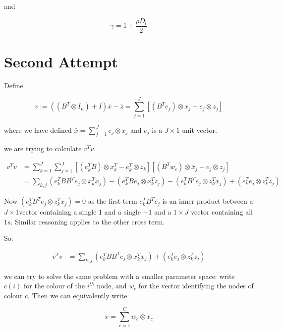 \documentclass{article}
\begin{document}
and 

\begin{equation}
\gamma = 1+ \frac{\rho D_l}{2}
\end{equation}

\section{Second Attempt}

Define

\begin{equation}
v := \left(\left(B^T \otimes I_n\right)+I\right)\bar{x}-\bar{z} = \sum_{j=1}^J \left[\left(B^Te_j\right)\otimes x_j - e_j\otimes z_j\right]
\end{equation}

where we have defined \(\bar{x} = \sum_{j=1}^J e_j \otimes x_j\) and \(e_j\) is a \(J \times 1\) unit vector.

we are trying to calculate \(v^Tv\). 

\begin{align*}
v^Tv &= \sum_{k=1}^J \sum_{j=1}^J \left[\left(e_k^TB\right)\otimes x_k^T - e_k^T\otimes z_k\right] \left[\left(B^Tw_c\right)\otimes \bar{x}_j - e_j\otimes z_j\right] \\
&= \sum_{k,j} \left(e_k^TBB^Te_j \otimes x_k^Tx_j\right) - \left(e_k^TBe_j \otimes x_k^Tz_j\right) - \left(e_k^T B^Te_j \otimes z_k^T x_j\right) + \left(e_k^T e_j \otimes z_k^T z_j\right)
\end{align*}

Now \(\left(e_k^T B^Te_j \otimes z_k^T x_j\right) = 0\) as the first term \( e_k^T B^Te_j  \) is an inner product between a \(J\times 1\)vector containing a single \(1\) and a single \(-1\) and a \(1\times J\) vector containing all \(1s\). Similar reasoning applies to the other cross term.

So:

\begin{align*}
v^Tv &= \sum_{k,j} \left(e_k^TBB^Te_j \otimes x_k^Tx_j\right) + \left(e_k^T e_j \otimes z_k^T z_j\right)
\end{align*}

we can try to solve the same problem with a smaller parameter space: write \(c\left(i\right)\) for the colour of the \(i^{th}\) node, and \(w_c\) for the vector identifying the nodes of colour \(c\). Then we can equivalently write 

\begin{equation}
\bar{x} = \sum_{c=1}^C w_c \otimes x_c
\end{equation}
\end{document}
